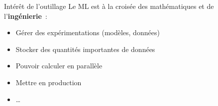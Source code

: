 \begin{frame}{Intérêt de l'outillage}
  Le ML est à la croisée des mathématiques et de l'\textbf{ingénierie}~:
  \begin{itemize}[<+(1)->]
    \item Gérer des expérimentations (modèles, données)
    \item Stocker des quantités importantes de données
    \item Pouvoir calculer en parallèle
    \item Mettre en production
    \item …
  \end{itemize}
\end{frame}
